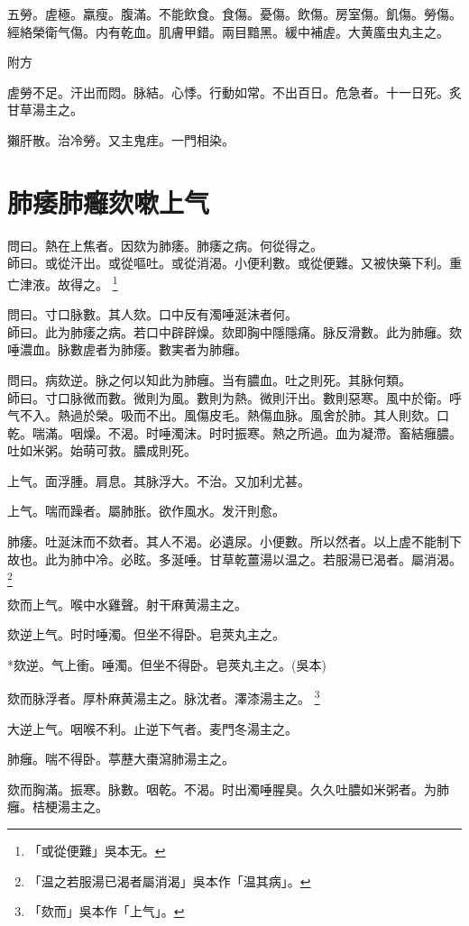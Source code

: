 \documentclass[12pt,twoside,UTF8,b5paper]{ctexbook}
\begin{document}
五勞。虗極。羸瘦。腹滿。不能飲食。食傷。憂傷。飲傷。房室傷。飢傷。勞傷。經絡榮衛气傷。内有乾血。肌膚甲錯。兩目黯黑。緩中補虗。大黄䗪虫丸主之。

附方

虗勞不足。汗出而悶。脉結。心悸。行動如常。不出百日。危急者。十一日死。炙甘草湯主之。

獺肝散。治冷勞。又主鬼疰。一門相染。

\chapter{肺痿肺癰欬嗽上气}

問曰。熱在上焦者。因欬为肺痿。肺痿之病。何從得之。\\
師曰。或從汗出。或從嘔吐。或從消渴。小便利數。{或從便難。}又被快藥下利。重亡津液。故得之。
	\footnote{「或從便難」吳本无。}

問曰。寸口脉數。其人欬。口中反有濁唾涎沫者何。\\
師曰。{此}为肺痿之病。若口中辟辟燥。欬即胸中隱隱痛。脉反滑數。此为肺癰。欬唾濃血。脉數虗者为肺痿。數実者为肺癰。

問曰。病欬逆。脉之何以知此为肺癰。当有膿血。吐之則死。其脉何類。\\
師曰。寸口脉微而數。微則为風。數則为熱。微則汗出。數則惡寒。風中於衛。呼气不入。熱過於榮。吸而不出。風傷皮毛。熱傷血脉。風舍於肺。其人則欬。口乾。喘滿。咽燥。不渴。时唾濁沫。时时振寒。熱之所過。血为凝滯。畜結癰膿。吐如米粥。始萌可救。膿成則死。

上气。面浮腫。肩息。其脉浮大。不治。又加利尤甚。

上气。喘而躁者。屬肺胀。欲作風水。发汗則愈。

肺痿。吐涎沫而不欬者。其人不渴。必遺尿。小便數。所以然者。以上虗不能制下故也。此为肺中冷。必眩。多涎唾。甘草乾薑湯以温之。若服湯已渴者。屬消渴。
	\footnote{「温之若服湯已渴者屬消渴」吳本作「温其病」。}

欬而上气。喉中水雞聲。射干麻黄湯主之。

欬逆上气。时时唾濁。但坐不得卧。皂莢丸主之。

*欬逆。气上衝。唾濁。但坐不得卧。皂莢丸主之。(吳本)

欬而脉浮者。厚朴麻黄湯主之。脉沈者。澤漆湯主之。
	\footnote{「欬而」吳本作「上气」。}

大逆上气。咽喉不利。止逆下气者。麦門冬湯主之。

肺癰。喘不得卧。葶藶大棗瀉肺湯主之。

欬而胸滿。振寒。脉數。咽乾。不渴。时出濁唾腥臭。久久吐膿如米粥者。为肺癰。桔梗湯主之。
\end{document}
